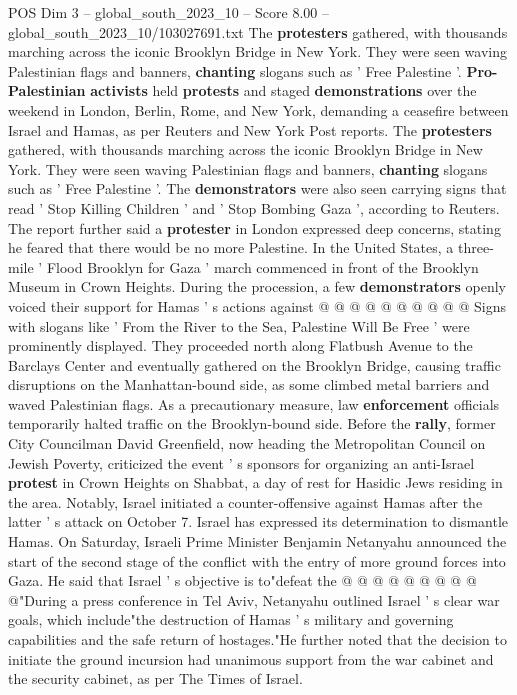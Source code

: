 \begin{textsample}{POS Dim 3 – global\_south\_2023\_10 – Score 8.00 – global\_south\_2023\_10/103027691.txt}  \label{ex:f3_pos_435}
The \textbf{protesters} gathered, with thousands marching across the iconic Brooklyn Bridge in New York.
They were seen waving Palestinian flags and banners, \textbf{chanting} slogans such as ' Free Palestine '. \textbf{Pro-Palestinian} \textbf{activists} held \textbf{protests} and staged \textbf{demonstrations} over the weekend in London, Berlin, Rome, and New York, demanding a ceasefire between Israel and Hamas, as per Reuters and New York Post reports.
The \textbf{protesters} gathered, with thousands marching across the iconic Brooklyn Bridge in New York.
They were seen waving Palestinian flags and banners, \textbf{chanting} slogans such as ' Free Palestine '.
The \textbf{demonstrators} were also seen carrying signs that read ' Stop Killing Children ' and ' Stop Bombing Gaza ', according to Reuters.
The report further said a \textbf{protester} in London expressed deep concerns, stating he feared that there would be no more Palestine.
In the United States, a three-mile ' Flood Brooklyn for Gaza ' march commenced in front of the Brooklyn Museum in Crown Heights.
During the procession, a few \textbf{demonstrators} openly voiced their support for Hamas ' s actions against @ @ @ @ @ @ @ @ @ @ Signs with slogans like ' From the River to the Sea, Palestine Will Be Free ' were prominently displayed.
They proceeded north along Flatbush Avenue to the Barclays Center and eventually gathered on the Brooklyn Bridge, causing traffic disruptions on the Manhattan-bound side, as some climbed metal barriers and waved Palestinian flags.
As a precautionary measure, law \textbf{enforcement} officials temporarily halted traffic on the Brooklyn-bound side.
Before the \textbf{rally}, former City Councilman David Greenfield, now heading the Metropolitan Council on Jewish Poverty, criticized the event ' s sponsors for organizing an anti-Israel \textbf{protest} in Crown Heights on Shabbat, a day of rest for Hasidic Jews residing in the area.
Notably, Israel initiated a counter-offensive against Hamas after the latter ' s attack on October 7.
Israel has expressed its determination to dismantle Hamas.
On Saturday, Israeli Prime Minister Benjamin Netanyahu announced the start of the second stage of the conflict with the entry of more ground forces into Gaza.
He said that Israel ' s objective is to"defeat the @ @ @ @ @ @ @ @ @ @"During a press conference in Tel Aviv, Netanyahu outlined Israel ' s clear war goals, which include"the destruction of Hamas ' s military and governing capabilities and the safe return of hostages."He further noted that the decision to initiate the ground incursion had unanimous support from the war cabinet and the security cabinet, as per The Times of Israel.

\end{textsample}
